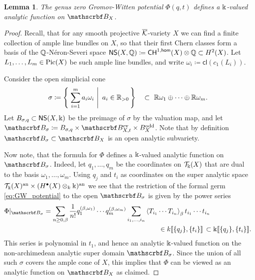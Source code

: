 \documentclass[twoside,leqno]{article}
\numberwithin{equation}{section}
\theoremstyle{plain}
\newtheorem{lemma}[equation]{Lemma}
\theoremstyle{definition}
\begin{document}
\begin{lemma} \label{lem:GW-potential_analytic}
The genus zero Gromov-Witten potential $\Phi(q,t)$ defines a $\Bbbk$-valued  analytic function on $\omB_{X}$.
\end{lemma}
\begin{proof} Recall, that for any smooth projective $\overline{\mathcal K}$-variety $X$  we can find a finite collection of ample line bundles on $X$, so that their first Chern classes form a basis of the  $\mathbb Q$-N\'{e}ron-Severi space $\mathsf{NS}(X,\mathbb Q) \coloneqq \mathsf{CH}^{1,\mathsf{hom}}(X)\otimes \mathbb Q \subset H^2(X)$.  
Let $L_{1}, \ldots, L_{m} \in \operatorname{Pic}(X)$ be such ample line bundles, and write $\omega_{i} \coloneqq \mathsf{cl}(c_{1}(L_{i}))$. 

Consider the open simplicial cone 
\[
\sigma \coloneqq \left\{\left. \, \sum_{i = 1}^{m} a_{i}\omega_{i} \ \right| \ a_{i} \in \bbR_{> 0}\, \right\} \quad \subset \ \bbR\omega_{1}\oplus \cdots \oplus \bbR\omega_{m}.
\]
Let $B_{\sigma,q} \subset \mathsf{NS}(X,\Bbbk)$ be the preimage of $\sigma$ by the valuation map, and let  
$\omB_{\sigma} \coloneqq B_{\sigma,q} \times \omB_{X,t}^{\even} \times B^{\odd}_{X}$. Note that by definition $\omB_{\sigma} \subset \omB_{X}$
is an open analytic subvariety.

Now note, that the formula for  $\Phi$ defines a $\Bbbk$-valued analytic function on $\omB_{\sigma}$. Indeed, let  
$q_{1}, \ldots, q_{m}$ be the coordinates on $\mathcal{T}_{\Bbbk}(X)$  that are dual to the basis 
$\omega_{1}, \ldots, \omega_{m}$. Using $q_{j}$ and $t_{i}$ as coordinates on the super analytic space $\mathcal{T}_{\Bbbk}(X)^{\operatorname{an}}\times (H^{\bullet}(X)\otimes_{k} \Bbbk)^{\operatorname{an}}$ we see that the restriction of the formal germ 
\eqref{eq:GW_potential} to the open $\omB_{\sigma}$ is given by the power series
  \[ 
\begin{aligned}
\Phi|_{\omB_{\sigma}} = \sum_{n\ge 0,\beta} \frac{1}{n!} q_1^{(\beta,\omega_1)}\cdots q_m^{(\beta,\omega_m)} \sum_{i_1,\dots,i_n} & \braket{T_{i_1}\cdots T_{i_n}}_\beta t_{i_1}\cdots t_{i_n} \\ 
& \qquad \in k\dbb{\{q_j\},\{t_i\}}  \, \subset 
\bbk\dbb{\{q_j\},\{t_i\}}.
\end{aligned}
\]
This series is  polynomial in $t_1$, and hence an analytic $\Bbbk$-valued function on  the non-archimedean analytic super domain $\omB_{\sigma}$. Since the union of all such $\sigma$ covers the ample cone of $X$, this implies that $\Phi$ can be viewed as an analytic function on $\omB_{X}$  as claimed.
\end{proof}
\end{document}
